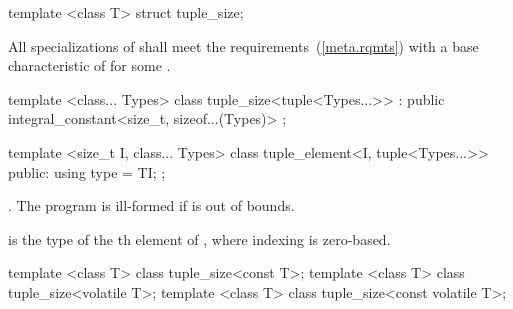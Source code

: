 %
\begin{itemdecl}
template <class T> struct tuple_size;
\end{itemdecl}

\begin{itemdescr}
\pnum
\remarks All specializations of  shall meet the
 requirements~(\ref{meta.rqmts}) with a
base characteristic of 
for some .
\end{itemdescr}

%
\begin{itemdecl}
template <class... Types>
  class tuple_size<tuple<Types...>> : public integral_constant<size_t, sizeof...(Types)> { };
\end{itemdecl}

%
\begin{itemdecl}
template <size_t I, class... Types>
  class tuple_element<I, tuple<Types...>> {
  public:
    using type = TI;
  };
\end{itemdecl}

\begin{itemdescr}
\pnum
\requires {}.
The program is ill-formed if  is out of bounds.

\pnum
\ctype {} is the
type of the th element of ,
where indexing is zero-based.
\end{itemdescr}

%
\begin{itemdecl}
template <class T> class tuple_size<const T>;
template <class T> class tuple_size<volatile T>;
template <class T> class tuple_size<const volatile T>;
\end{itemdecl}

